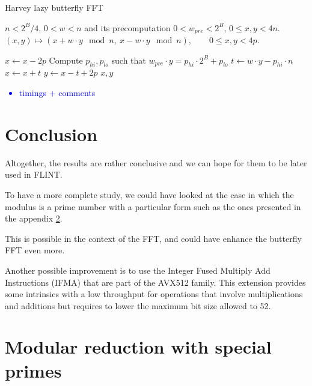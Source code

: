 \documentclass[a4paper]{article}
\begin{document}
\begin{algorithm}
    \caption{Harvey lazy butterfly FFT}
    \begin{algorithmic}[1]
        \Require $n < 2^B/4$,
        \Require $0 < w < n$ and its precomputation $0 < w_{pre} < 2^B$,
        \Require $0 \leq x, y < 4n$.
        \Ensure $(x,y) \mapsto (x + w\cdot y \mod n,\ x - w\cdot y \mod n), \qquad 0 \leq x,y < 4p.$

            \State $x \gets x - 2p$
        \EndIf
        \State Compute $p_{hi}, p_{lo}$ such that $w_{pre} \cdot y = p_{hi}\cdot 2^B + p_{lo}$ 
        \State $t \gets w\cdot y - p_{hi}\cdot n$ 
        \State $x \gets x + t$
        \State $y \gets x - t + 2p$
        \State \Return $x,y$
    \end{algorithmic}
\end{algorithm}

\newpage
\textcolor{blue}{
    \begin{itemize}
        \item timings + comments
    \end{itemize}
}


\section{Conclusion}

Altogether, the results are rather conclusive and we can hope for them to be later used in FLINT. 

\bigskip
To have a more complete study, we could have looked at the case in which the modulus is a prime number
with a particular form such as the ones presented in the appendix \ref{app}. 

This is possible in the context of the FFT, and could have enhance the butterfly FFT even more.

\bigskip
Another possible improvement is to use the Integer Fused Multiply Add Instructions (IFMA) that are part of
the AVX512 family. This extension provides some intrinsics with a low throughput for operations that involve
multiplications and additions but requires to lower the maximum bit size allowed to 52.


\newpage
 
 
\nocite{*}


\newpage
\appendix
\section{Modular reduction with special primes} \label{app}
\end{document}
